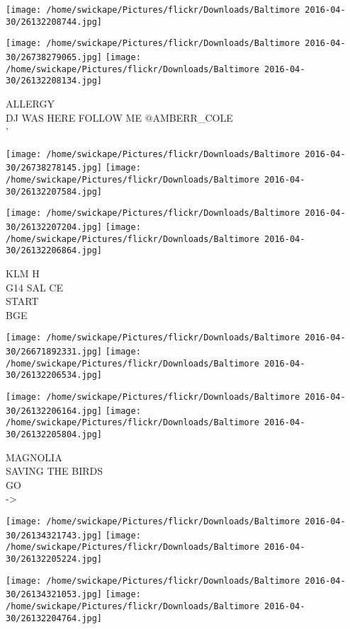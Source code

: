 \documentclass[10pt,letterpaper]{article}
\begin{document}
\texttt{[image: /home/swickape/Pictures/flickr/Downloads/Baltimore 2016-04-30/26132208744.jpg]}

\vspace{0.25in}
\texttt{[image: /home/swickape/Pictures/flickr/Downloads/Baltimore 2016-04-30/26738279065.jpg]}
\texttt{[image: /home/swickape/Pictures/flickr/Downloads/Baltimore 2016-04-30/26132208134.jpg]}

ALLERGY\\
DJ WAS HERE FOLLOW ME @AMBERR\_COLE\\
'
\pagebreak

\texttt{[image: /home/swickape/Pictures/flickr/Downloads/Baltimore 2016-04-30/26738278145.jpg]}
\texttt{[image: /home/swickape/Pictures/flickr/Downloads/Baltimore 2016-04-30/26132207584.jpg]}

\texttt{[image: /home/swickape/Pictures/flickr/Downloads/Baltimore 2016-04-30/26132207204.jpg]}
\texttt{[image: /home/swickape/Pictures/flickr/Downloads/Baltimore 2016-04-30/26132206864.jpg]}

KLM H\\
G14 SAL CE\\
START\\
BGE
\pagebreak

\texttt{[image: /home/swickape/Pictures/flickr/Downloads/Baltimore 2016-04-30/26671892331.jpg]}
\texttt{[image: /home/swickape/Pictures/flickr/Downloads/Baltimore 2016-04-30/26132206534.jpg]}

\texttt{[image: /home/swickape/Pictures/flickr/Downloads/Baltimore 2016-04-30/26132206164.jpg]}
\texttt{[image: /home/swickape/Pictures/flickr/Downloads/Baltimore 2016-04-30/26132205804.jpg]}

MAGNOLIA\\
SAVING THE BIRDS\\
GO\\
{-}>
\pagebreak

\texttt{[image: /home/swickape/Pictures/flickr/Downloads/Baltimore 2016-04-30/26134321743.jpg]}
\texttt{[image: /home/swickape/Pictures/flickr/Downloads/Baltimore 2016-04-30/26132205224.jpg]}

\texttt{[image: /home/swickape/Pictures/flickr/Downloads/Baltimore 2016-04-30/26134321053.jpg]}
\texttt{[image: /home/swickape/Pictures/flickr/Downloads/Baltimore 2016-04-30/26132204764.jpg]}
\end{document}
